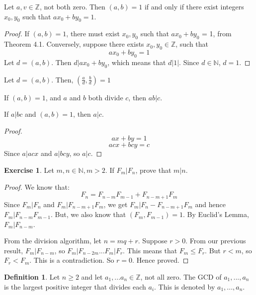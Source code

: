 \documentclass[12pt,letterpaper]{amsbook}
\theoremstyle{definition}
\newtheorem{definition}{Definition} %
\newtheorem*{exercise}{Exercise}
\newcommand{\N}{\mathbb{N}}
\newcommand{\Z}{\mathbb{Z}}
\begin{document}
\begin{theorem}
  Let $a,v \in \Z$, not both zero. Then $(a,b) = 1$ if and only if there exist integers $x_0,y_0$ such that $ax_0 + by_0 = 1$.  
\end{theorem}
\begin{proof}
  If $(a,b) = 1$, there must exist $x_0,y_0$ such that $ax_0+by_0$ = 1, from Theorem 4.1.
  Conversely, suppose there exists $x_0,y_0 \in \Z$, such that 
  \[ax_0 + by_0 = 1\]
  Let $d = (a,b)$. Then $d|ax_0+by_0$, which means that $d|1|$. Since $d \in \N$, $d=1$.
\end{proof}

\begin{corollary}
  Let $d = (a,b)$. Then, $(\frac{a}{d}, \frac{b}{d}) = 1$
\end{corollary}

\begin{corollary}
  If $(a,b) = 1$, and $a$ and $b$ both divide $c$, then $ab|c$.  
\end{corollary}

\begin{theorem}
  If $a|bc$ and $(a,b) = 1$, then $a|c$.  
\end{theorem}
\begin{proof}
  \[ax+by = 1\]
  \[acx+bcy=c\]
  Since $a|acx$ and $a|bcy$, so $a|c$.
\end{proof}

\begin{exercise}
  Let $m, n \in \N, m > 2$. If $F_m|F_n$, prove that $m|n$.
\end{exercise}
\begin{proof}
  We know that:
  \[F_n = F_{n-m}F_{m-1} + F_{n-m+1}F_m\]
  Since $F_m|F_n$ and $F_m|F_{n-m+1}F_m$, we get $F_m|F_n-F_{n-m+1}F_m$ and hence $F_m|F_{n-m}F_{m-1}$. But, we also know that $(F_m,F_{m-1}) = 1$. By Euclid's Lemma, $F_m|F_{n-m}$.
  
  From the division algorithm, let $n = mq+r$. Suppose $r > 0$. From our previous result, $F_m|F_{n-m}$, so $F_m|F_{n-2m}...F_m|F_r$. This means that $F_m \leq F_r$. But $r < m$, so $F_r < F_m$. This is a contradiction. So $r = 0$. Hence proved.
\end{proof}

\begin{definition}
  Let $n \geq 2$ and let $a_1,...a_n \in \Z$, not all zero. The GCD of $a_1,...,a_n$ is the largest positive integer that divides each $a_i$. This is denoted by $a_1,...,a_n$.  
\end{definition}
\end{document}
